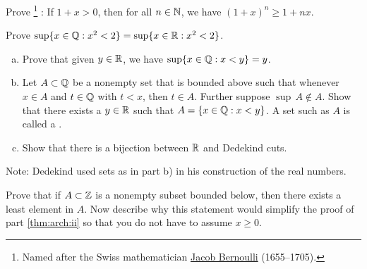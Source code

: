 \begin{exercise} \label{exercise:bernoulliineq}
Prove \emph{}%
\footnote{%
Named after the Swiss mathematician
\href{https://en.wikipedia.org/wiki/Jacob_Bernoulli}{Jacob Bernoulli}
(1655--1705).}%
: If $1+x > 0$, then
for all $n \in {\mathbb{N}}$, we have $(1+x)^n \geq 1+nx$.
\end{exercise}

\begin{exercise} \label{exercise:sqrt2QorR}
Prove $\sup \{ x \in {\mathbb{Q}} : x^2 < 2 \} = \sup \{ x \in {\mathbb{R}} : x^2 < 2 \}$.
\end{exercise}

\begin{exercise} \label{exercise:Dedekind}
\leavevmode
\begin{enumerate}[a)]
\item
Prove that given $y \in {\mathbb{R}}$, we have $\sup \{ x \in {\mathbb{Q}} : x < y \} = y$.
\item
Let $A \subset {\mathbb{Q}}$ be a nonempty set that is bounded above such that whenever $x
\in A$ and $t \in {\mathbb{Q}}$ with $t < x$, then $t \in A$.  Further suppose
$\sup\, A \notin A$.  Show that there exists a $y \in {\mathbb{R}}$ such that
$A = \{ x \in {\mathbb{Q}} : x < y \}$.  A set such as $A$ is called a
\emph{}.
\item
Show that there is a bijection between ${\mathbb{R}}$ and Dedekind cuts.
\end{enumerate}
Note: Dedekind used sets as in part b) in his construction of the
real numbers.
\end{exercise}

\begin{exercise}
Prove that if $A \subset {\mathbb{Z}}$ is a nonempty subset bounded below, then
there exists a least element in $A$.
Now describe why this statement would simplify the proof of
 part \ref{thm:arch:ii} so that you do not have to assume
$x \geq 0$.
\end{exercise}

